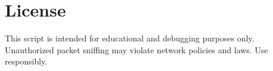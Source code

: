 \documentclass[letterpaper,10pt,english]{sphinxmanual}
\begin{document}
\section{License}
\label{\detokenize{packet_sniffer_doc:license}}
\sphinxAtStartPar
This script is intended for educational and debugging purposes only. Unauthorized packet sniffing may violate network policies and laws. Use responsibly.



\renewcommand{\indexname}{Index}
\printindex
\end{document}
